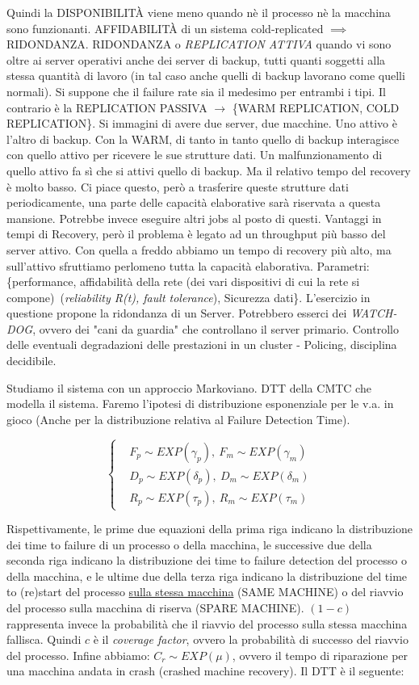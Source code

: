 Quindi la DISPONIBILIT\`A viene meno quando nè il processo nè la macchina sono funzionanti. AFFIDABILIT\`A di un sistema cold-replicated $\implies$ RIDONDANZA. RIDONDANZA o \textit{REPLICATION ATTIVA} quando vi sono oltre ai server operativi anche dei server di backup, tutti quanti soggetti alla stessa quantità di lavoro (in tal caso anche quelli di backup lavorano come quelli normali). Si suppone che il failure rate sia il medesimo per entrambi i tipi. Il contrario è la REPLICATION PASSIVA $\rightarrow$ \{WARM REPLICATION, COLD REPLICATION\}. Si immagini di avere due server, due macchine. Uno attivo è l'altro di backup. Con la WARM, di tanto in tanto quello di backup interagisce con quello attivo per ricevere le sue strutture dati. Un malfunzionamento di quello attivo fa sì che si attivi quello di backup. Ma il relativo tempo del recovery è molto basso. Ci piace questo, però a trasferire queste strutture dati periodicamente, una parte delle capacità elaborative sarà riservata a questa mansione. Potrebbe invece eseguire altri jobs al posto di questi. Vantaggi in tempi di Recovery, però il problema è legato ad un throughput più basso del server attivo. Con quella a freddo abbiamo un tempo di recovery più alto, ma sull'attivo sfruttiamo perlomeno tutta la capacità elaborativa. Parametri: \{performance, affidabilità della rete (dei vari dispositivi di cui la rete si compone)\ (\textit{reliability R(t), fault tolerance}), Sicurezza dati\}. L'esercizio in questione propone la ridondanza di un Server. Potrebbero esserci dei \textit{WATCH-DOG}, ovvero dei "cani da guardia" che controllano il server primario. Controllo delle eventuali degradazioni delle prestazioni in un cluster - Policing, disciplina decidibile.

Studiamo il sistema con un approccio Markoviano. DTT della CMTC che modella il sistema. Faremo l'ipotesi di distribuzione esponenziale per le v.a. in gioco (Anche per la distribuzione relativa al Failure Detection Time).

\[
	\left\{
	\begin{aligned}
	&F_p \sim EXP(\gamma_p),\ F_m \sim EXP(\gamma_m)\\
	&D_p \sim EXP(\delta_p),\ D_m \sim EXP(\delta_m) \\
	&R_p \sim EXP(\tau_p),\ R_m \sim EXP(\tau_m)
	\end{aligned}
	\right.
\]

Rispettivamente, le prime due equazioni della prima riga indicano la distribuzione dei time to failure di un processo o della macchina, le successive due della seconda riga indicano la distribuzione dei time to failure detection del processo o della macchina, e le ultime due della terza riga indicano la distribuzione del time to (re)start del processo \underline{sulla stessa macchina} (SAME MACHINE) o del riavvio del processo sulla macchina di riserva (SPARE MACHINE). $(1-c)$ rappresenta invece la probabilità che il riavvio del processo sulla stessa macchina fallisca. Quindi $c$ è il \textit{coverage factor}, ovvero la probabilità di successo del riavvio del processo. Infine abbiamo: $C_r \sim EXP(\mu)$, ovvero il tempo di riparazione per una macchina andata in crash (crashed machine recovery). Il DTT è il seguente:

